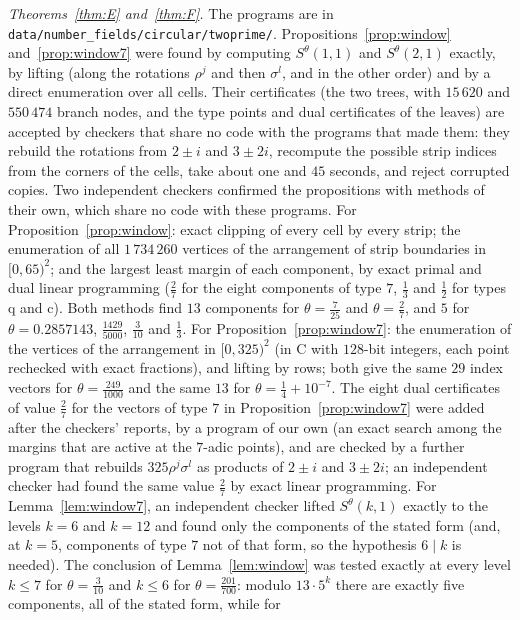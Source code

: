 \documentclass[11pt,a4paper]{amsart}
\theoremstyle{remark}
\begin{document}
\emph{Theorems~\ref{thm:E} and~\ref{thm:F}.} The programs are in \nolinkurl{data/number_fields/circular/twoprime/}.
Propositions~\ref{prop:window} and~\ref{prop:window7} were found by computing $S^\theta(1,1)$ and $S^\theta(2,1)$
exactly, by lifting (along the rotations $\rho^j$ and then $\sigma^l$, and in the other order) and by a direct
enumeration over all cells. Their certificates (the two trees, with $15\,620$ and $550\,474$ branch nodes, and the type
points and dual certificates of the leaves) are accepted by checkers that share no code with the programs that made
them: they rebuild the rotations from $2\pm i$ and $3\pm2i$, recompute the possible strip indices from the corners of
the cells, take about one and $45$ seconds, and reject corrupted copies. Two independent checkers confirmed the propositions with
methods of their own, which share no code with these programs. For Proposition~\ref{prop:window}: exact clipping of
every cell by every strip; the enumeration of all $1\,734\,260$ vertices of the arrangement of strip boundaries in
$[0,65)^2$; and the largest least margin of each component, by exact primal and dual linear programming ($\frac27$
for the eight components of type $7$, $\frac13$ and $\frac12$ for types q and c). Both methods find $13$ components
for $\theta=\frac7{25}$ and $\theta=\frac27$, and $5$ for $\theta=0.2857143$, $\frac{1429}{5000}$, $\frac3{10}$ and
$\frac13$. For Proposition~\ref{prop:window7}: the enumeration of the vertices of the arrangement in $[0,325)^2$ (in C
with $128$-bit integers, each point rechecked with exact fractions), and lifting by rows; both give the same $29$
index vectors for $\theta=\frac{249}{1000}$ and the same $13$ for $\theta=\frac14+10^{-7}$. The eight dual
certificates of value $\frac27$ for the vectors of type $7$ in Proposition~\ref{prop:window7} were added after the
checkers' reports, by a program of our own (an exact search among the margins that are active at the $7$-adic points),
and are checked by a further program that rebuilds $325\rho^j\sigma^l$ as products of $2\pm i$ and $3\pm2i$; an independent
checker had found the same value $\frac27$ by exact linear programming. For Lemma~\ref{lem:window7}, an
independent checker lifted $S^\theta(k,1)$ exactly to the levels $k=6$ and $k=12$ and found only the components of the
stated form (and, at $k=5$, components of type $7$ not of that form, so the hypothesis $6\mid k$ is needed). The
conclusion of
Lemma~\ref{lem:window} was tested exactly at every level $k\le7$ for $\theta=\frac3{10}$ and $k\le6$ for
$\theta=\frac{201}{700}$: modulo $13\cdot5^k$ there are exactly five components, all of the stated form, while for
\end{document}
